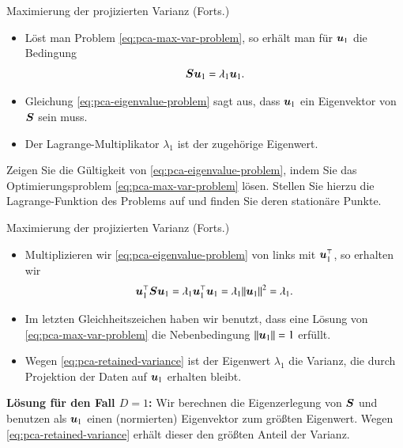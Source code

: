 \begin{frame}{Maximierung der projizierten Varianz (Forts.)}{}
	\begin{itemize}
		\item Löst man Problem \eqref{eq:pca-max-var-problem}, so erhält man für $\bm{u}_1$ die Bedingung
		\begin{equation} \label{eq:pca-eigenvalue-problem}
			\bm{S} \bm{u}_1 = \lambda_1 \bm{u}_1.
		\end{equation}
		\item Gleichung \eqref{eq:pca-eigenvalue-problem} sagt aus, dass $\bm{u}_1$ ein Eigenvektor von $\bm{S}$ sein muss.
		\item Der Lagrange-Multiplikator $\lambda_1$ ist der zugehörige Eigenwert.
	\end{itemize}

	\begin{mytask}
		Zeigen Sie die Gültigkeit von \eqref{eq:pca-eigenvalue-problem}, indem Sie das
		Optimierungsproblem \eqref{eq:pca-max-var-problem} lösen. Stellen Sie hierzu die Lagrange-Funktion des Problems auf
		und finden Sie deren stationäre Punkte.
	\end{mytask}
\end{frame}


\begin{frame}{Maximierung der projizierten Varianz (Forts.)}{}
	\begin{itemize}
		\item Multiplizieren wir \eqref{eq:pca-eigenvalue-problem} von links mit $\bm{u}_1^\top$, so erhalten wir
		\begin{equation} \label{eq:pca-retained-variance}
			\bm{u}_1^\top \bm{S} \bm{u}_1 = \lambda_1 \bm{u}_1^\top \bm{u}_1 = \lambda_1 \Vert \bm{u}_1 \Vert^2 = \lambda_1.
		\end{equation}
		\item Im letzten Gleichheitszeichen haben wir benutzt, dass eine Lösung von \eqref{eq:pca-max-var-problem}
			die Nebenbedingung $\Vert \bm{u}_1 \Vert = 1$ erfüllt.
		\item Wegen \eqref{eq:pca-retained-variance} ist der Eigenwert $\lambda_1$ die Varianz, die durch Projektion der Daten
			auf $\bm{u}_1$ erhalten bleibt.
	\end{itemize}

	\begin{boxGray}
		\textbf{Lösung für den Fall $D = 1$:} Wir berechnen die Eigenzerlegung von $\bm{S}$ und benutzen als $\bm{u}_1$
		einen (normierten) Eigenvektor zum größten Eigenwert. Wegen \eqref{eq:pca-retained-variance} erhält dieser den
		größten Anteil der Varianz.
	\end{boxGray}
\end{frame}


